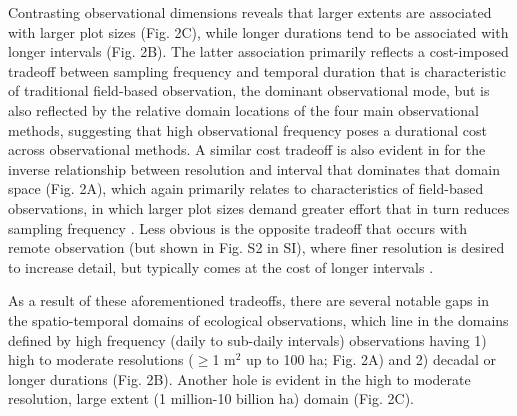 \documentclass[12pt]{article}
\begin{document}
Contrasting observational dimensions reveals that larger extents are associated with larger plot sizes (Fig. 2C), while longer durations tend to be associated with longer intervals (Fig. 2B). The latter association primarily reflects a cost-imposed tradeoff between sampling frequency and temporal duration that is characteristic of traditional field-based observation, the dominant observational mode, but is also reflected by the relative domain locations of the four main observational methods, suggesting that high observational frequency poses a durational cost across observational methods. A similar cost tradeoff is also evident in for the inverse relationship between resolution and interval that dominates that domain space (Fig. 2A), which again primarily relates to characteristics of field-based observations, in which larger plot sizes demand greater effort that in turn reduces sampling frequency \cite{kareiva_spatial_1988}. Less obvious is the opposite tradeoff that occurs with remote observation (but shown in Fig. S2 in SI), where finer resolution is desired to increase detail, but typically comes at the cost of longer intervals \cite{estes_platform_2016}.   

As a result of these aforementioned tradeoffs, there are several notable gaps in the spatio-temporal domains of ecological observations, which line in the domains defined by high frequency (daily to sub-daily intervals) observations having 1) high to moderate resolutions ($\geq$1 m$^2$ up to 100 ha; Fig. 2A) and 2) decadal or longer durations (Fig. 2B).  Another hole is evident in the high to moderate resolution, large extent (1 million-10 billion ha) domain (Fig. 2C). 
\end{document}
